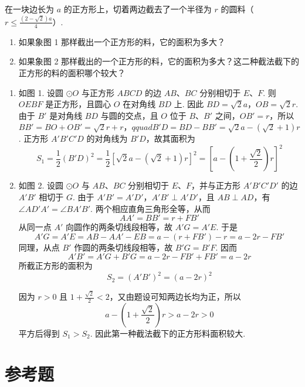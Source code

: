 \begin{problem}
在一块边长为 \( a \) 的正方形上，切着两边截去了一个半径为 \( r \) 的圆料（\( r\le\frac{\left( 2-\sqrt{2} \right)a}{4} \)）.

\begin{enumerate}
\item 如果象图 1 那样截出一个正方形的料，它的面积为多大？
\item 如果象图 2 那样截出的一个正方形的料，它的面积为多大？这二种截法截下的正方形的料的面积哪个较大？
\end{enumerate}

\hfill
{}
\end{problem}

\begin{solution}
\begin{enumerate}
\item 如图 1. 设圆 \(\odot O\) 与正方形 \(ABCD\) 的边 \(AB\)、\(BC\) 分别相切于 \(E\)、\(F\). 则 \(OEBF\) 是正方形，且圆心 \(O\) 在对角线 \(BD\) 上. 因此
\(BD=\sqrt{2}a\)，\(OB=\sqrt{2}r\).
由于 \(B'\) 是对角线 \(BD\) 与圆的交点，且 \(O\) 位于 \(B\)、\(B'\) 之间，\(OB'=r\)，所以
\(BB'=BO+OB'=\sqrt{2}r+r\)，\(qquad B'D=BD-BB'=\sqrt{2}a-(\sqrt{2}+1)r\).
正方形 \(A'B'C'D\) 的对角线为 \(B'D\)，故其面积为
\[
S_1=\frac{1}{2}(B'D)^2=\frac{1}{2}\left[\sqrt{2}a-(\sqrt{2}+1)r\right]^2=\left[a-\left(1+\frac{\sqrt{2}}{2}\right)r\right]^2
\]

\item 如图 2. 设圆 \(\odot O\) 与 \(AB\)、\(BC\) 分别相切于 \(E\)、\(F\)，并与正方形 \(A'B'C'D'\) 的边 \(A'B'\) 相切于 \(G\). 由于 \(A'B'=A'D'\)，\(A'B'\perp A'D'\)，且 \(AB\perp AD\)，有 \(\angle AD'A'=\angle BA'B'\). 两个相应直角三角形全等，从而
\[
AA'=BB'=r+FB'
\]
从同一点 \(A'\) 向圆作的两条切线段相等，故 \(A'G=A'E\). 于是
\[
A'G=A'E=AB-AA'-EB=a-(r+FB')-r=a-2r-FB'
\]
同理，从点 \(B'\) 作圆的两条切线段相等，故 \(B'G=B'F\). 因而
\[
A'B'=A'G+B'G=a-2r-FB'+FB'=a-2r
\]
所截正方形的面积为
\[
S_2=(A'B')^2=(a-2r)^2
\]

因为 \(r>0\) 且 \(1+\frac{\sqrt{2}}{2}<2\)，又由题设可知两边长均为正，所以
\[
a-\left(1+\frac{\sqrt{2}}{2}\right)r>a-2r>0
\]
平方后得到 \(S_1>S_2\). 因此第一种截法截下的正方形料面积较大.
\end{enumerate}
\end{solution}

\section{参考题}

